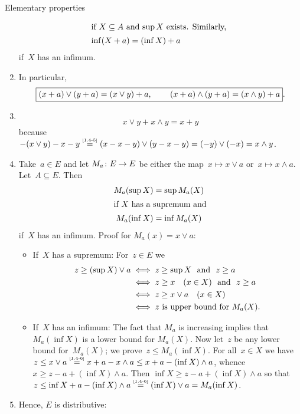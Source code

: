 \documentclass[main.tex]{subfiles}
\begin{document}
\begin{psec}{Elementary properties}
\begin{enumerate}
\begin{align*}
\intertext{%
if $X\subseteq A$ and $\sup X$ exists.
Similarly, }
\inf (X+a) &= (\inf X)+a
\end{align*}
if~$X$ has an infimum.
\item %
\label{1.4-5}
In particular,
\begin{equation*}
\frmd{%
(x+a)\vee   (y+a)=(x\vee y)+a
\htam{, } \qquad 
(x+a)\wedge (y+a)=(x\wedge y)+a }
\htam{.}
\end{equation*}
\item %
\label{1.4-6}  
$ $ %
\begin{equation*}
x\vee y + x\wedge y = x+y
\end{equation*}
because~$-(x\vee y)-x-y 
\isref{1.4-5}
(x-x-y)\vee(y-x-y)=(-y)\vee(-x)=x\wedge y$.
\item %
\label{1.4-7}
Take~$a\in E$ and let $M_a\colon E\rightarrow E$ 
be either the map~$x\mapsto x\vee a$
or~$x\mapsto x\wedge a$. 
Let~$A\subseteq E$.
Then
\begin{align*}
M_a(\sup X) &= \sup M_a(X) \\
\intertext{%
if $X$ has a supremum and}
M_a(\inf X) &= \inf M_a(X)
\end{align*}
if~$X$ has an infimum.
Proof for $M_a(x)=x\vee a$:
\begin{itemize}
\item %
If~$X$ has a supremum:  
For~$z\in E$ we
\begin{align*}
z\ge (\sup X)\vee a  
  & \iff z\ge \sup X\ \textnormal{ and }\  z\ge a \\
  & \iff z\ge x\quad (x\in X)\ \textnormal{ and }\  z\ge a\\
  & \iff z\ge x\vee a\quad (x\in X) \\
  & \iff z\textnormal{ is upper bound for }M_a(X)\textnormal{.}
\end{align*}
\item %
If~$X$ has an infimum: 
The fact that $M_a$ is increasing 
implies that $M_a(\inf X)$ is a lower bound
for $M_a(X)$.
Now let~$z$
be any lower bound for~$M_a(X)$;
we prove~$z\leq M_a(\inf X)$.
For all~$x\in X$
we have
$z\leq x\vee a 
\isref{1.4-6}
x+a - x\wedge a
\leq x+a-(\inf X)\wedge a$,
whence
$x\ge z-a+(\inf X)\wedge a$.
Then $\inf X\geq z-a+(\inf X)\wedge a$
so that 
$z\leq \inf X +a - (\inf X)\wedge a
\isref{1.4-6}
(\inf X)\vee a = M_a(\inf X)$.
\end{itemize}
\item %
\label{1.4-8}
Hence, $E$ is distributive:
\begin{equation*}

\end{equation*}
\end{enumerate}
\end{psec}
\end{document}
